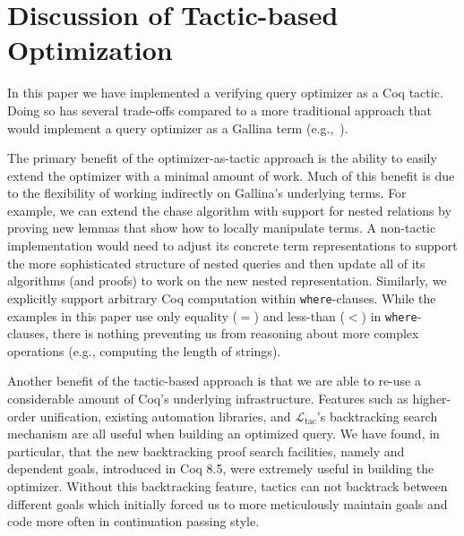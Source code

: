 \documentclass[preprint]{sigplanconf}
\newcommand{\greg}[1]{\textcolor{blue}{GREG: #1}}
\newcommand{\ltac}[0]{\ensuremath{\mathcal{L}_{\mathrm{tac}}}}
\begin{document}

\section{Discussion of Tactic-based Optimization}
\label{sec:discussion}

In this paper we have implemented a verifying query optimizer as a Coq tactic.  Doing so has several trade-offs compared to a more traditional approach that would implement a query optimizer as a Gallina term (e.g.,~\cite{coqdb}).

The primary benefit of the optimizer-as-tactic approach is the ability to easily extend the optimizer with a minimal amount of work.
Much of this benefit is due to the flexibility of working indirectly on Gallina's underlying terms.
For example, we can extend the chase algorithm with support for nested relations by proving new lemmas that show how to locally manipulate terms.
A non-tactic implementation would need to adjust its concrete term representations to support the more sophisticated structure of nested queries and then update all of its algorithms (and proofs) to work on the new nested representation.
Similarly, we explicitly support arbitrary Coq computation within {\tt where}-clauses.
While the examples in this paper use only equality ($=$) and less-than ($<$) in {\tt where}-clauses, there is nothing preventing us from reasoning about more complex operations (e.g., computing the length of strings).

Another benefit of the tactic-based approach is that we are able to re-use a considerable amount of Coq's underlying infrastructure.
Features such as higher-order unification, existing automation libraries, and \ltac's backtracking search mechanism are all useful when building an optimized query.
We have found, in particular, that the new backtracking proof search facilities, namely \coqe{+} and dependent goals, introduced in Coq 8.5, were extremely useful in building the optimizer.
Without this backtracking feature, tactics can not backtrack between different goals which initially forced us to more meticulously maintain goals and code more often in continuation passing style.
\end{document}

